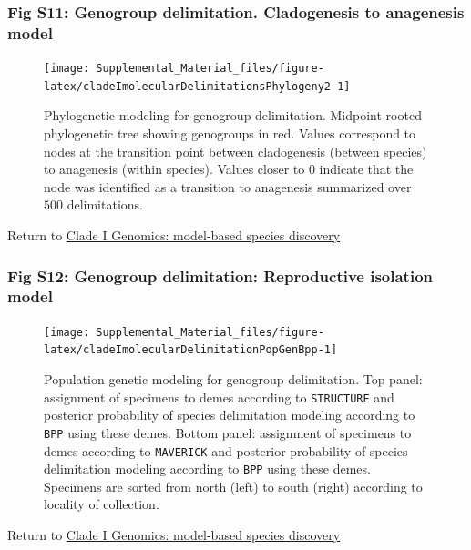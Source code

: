 \documentclass[
  11pt,
]{article}
\begin{document}
\hypertarget{fig-s11-genogroup-delimitation.-cladogenesis-to-anagenesis-model}{%
\subsubsection{Fig S11: Genogroup delimitation. Cladogenesis to anagenesis model}\label{fig-s11-genogroup-delimitation.-cladogenesis-to-anagenesis-model}}

\begin{figure}
\texttt{[image: Supplemental\_Material\_files/figure-latex/cladeImolecularDelimitationsPhylogeny2-1]} \caption{Phylogenetic modeling for genogroup delimitation. Midpoint-rooted phylogenetic tree showing genogroups in red. Values correspond to nodes at the transition point between cladogenesis (between species) to anagenesis (within species). Values closer to 0 indicate that the node was identified as a transition to anagenesis summarized over $500$ delimitations.}\label{fig:cladeImolecularDelimitationsPhylogeny2}
\end{figure}

Return to \protect\hyperlink{model-based-species-discovery-1}{Clade I Genomics: model-based species discovery}
\pagebreak

\hypertarget{fig-s12-genogroup-delimitation-reproductive-isolation-model}{%
\subsubsection{Fig S12: Genogroup delimitation: Reproductive isolation model}\label{fig-s12-genogroup-delimitation-reproductive-isolation-model}}

\begin{figure}
\texttt{[image: Supplemental\_Material\_files/figure-latex/cladeImolecularDelimitationPopGenBpp-1]} \caption{Population genetic modeling for genogroup delimitation. Top panel: assignment of specimens to demes according to \texttt{STRUCTURE} and posterior probability of species delimitation modeling according to \texttt{BPP} using these demes. Bottom panel: assignment of specimens to demes according to \texttt{MAVERICK} and posterior probability of species delimitation modeling according to \texttt{BPP} using these demes. Specimens are sorted from north (left) to south (right) according to locality of collection.}\label{fig:cladeImolecularDelimitationPopGenBpp}
\end{figure}

Return to \protect\hyperlink{model-based-species-discovery-1}{Clade I Genomics: model-based species discovery}
\pagebreak
\end{document}
